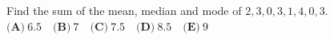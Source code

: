 Find the sum of the mean, median and mode of $2,3,0,3,1,4,0,3$. $\textbf{(A)}\ 6.5\quad\textbf{(B)}\ 7\quad\textbf{(C)}\ 7.5\quad\textbf{(D)}\ 8.5\quad\textbf{(E)}\ 9$
